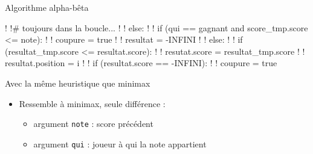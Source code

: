 \documentclass{beamer}
\begin{document}
\begin{frame}[fragile]{Algorithme alpha-bêta}
\begin{onlyenv}
        \vspace{10mm}
        \begin{pseudocode}
            !  !# toujours dans la boucle...
            !  !    else:
            !  !        if (qui == gagnant and score_tmp.score <= note):
            !  !            coupure = true
            !  !            resultat = -INFINI
            !  !        else:
            !  !            if (resultat_tmp.score <= resultat.score):
            !  !                resutat.score = resultat_tmp.score
            !  !                resultat.position = i
            !  !                if (resultat.score == -INFINI):
            !  !                    coupure = true
        \end{pseudocode}
        Avec la même heuristique que minimax
    \end{onlyenv}
    \begin{itemize}
        \item<1> Ressemble à minimax, seule différence :
            \begin{itemize}
                \item argument \texttt{note} : score précédent
                \item argument \texttt{qui} : joueur à qui la note appartient
            \end{itemize}
    \end{itemize}
\end{frame}
\end{document}
